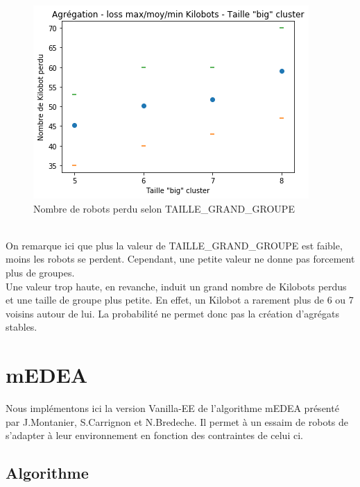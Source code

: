 \documentclass[a4paper]{article}
\begin{document}
\begin{figure}[h]
	\centering
	\begin{minipage}[c]{.46\linewidth}
		\centering
		\includegraphics[width=1.1\linewidth]{../../script_results/Agregation_loss_kilobot_big_cluster.png}
		\caption{Nombre de robots perdu selon TAILLE\_GRAND\_GROUPE}
	\end{minipage}
\end{figure}
\\On remarque ici que plus la valeur de TAILLE\_GRAND\_GROUPE est faible, moins les robots se perdent. Cependant, une petite valeur ne donne pas forcement plus de groupes.\\
Une valeur trop haute, en revanche, induit un grand nombre de Kilobots perdus et une taille de groupe plus petite. En effet, un Kilobot a rarement plus de 6 ou 7 voisins autour de lui. La probabilité ne permet donc pas la création d'agrégats stables.
\newpage
\section{mEDEA}
Nous implémentons ici la version Vanilla-EE de l'algorithme mEDEA présenté par J.Montanier, S.Carrignon et N.Bredeche.  \cite{montanier_behavioral_2016} Il permet à un essaim de robots de s'adapter à leur environnement en fonction des contraintes de celui ci.
\subsection{Algorithme}
\end{document}
